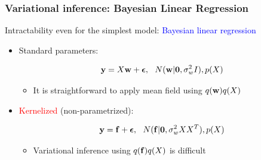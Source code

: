 \documentclass{beamer}
\begin{document}
\frame
{

\frametitle{Variational inference: Bayesian Linear Regression}

Intractability even for the simplest model: 
\textcolor{blue}{Bayesian linear regression}

\begin{itemize} 

\item Standard parameters: 

      $$
      \bfy = X \bfw + \bfepsilon, \ \ N(\bfw|\bfzero, \sigma_w^2
      I), p(X)
      $$
     
     \begin{itemize}
      \item It is straightforward to apply mean field 
            using $q(\mathbf{w})q(X)$
     \end{itemize}
      
\item \textcolor{red}{Kernelized} (non-parametrized):

       
      $$
      \bfy = \bff + \bfepsilon, \ \  N(\bff|\bfzero, \sigma_w^2
      XX^T), p(X)
      $$
     

\begin{itemize}

 \item Variational inference using $q(\mathbf{f}) q(X)$ is difficult

\end{itemize}

%
%
%
%
%

\end{itemize}

}
\end{document}
